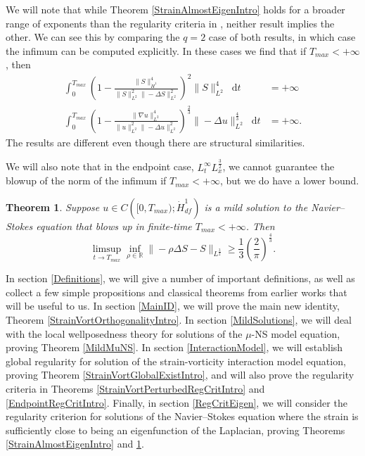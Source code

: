 \documentclass[11pt]{article}
\theoremstyle{plain}
\newtheorem{theorem}{Theorem}[section]
\theoremstyle{remark}
\numberwithin{equation}{section}
\newcommand{\diff}{\mathop{}\!\mathrm{d}}
\begin{document}
We will note that while Theorem \ref{StrainAlmostEigenIntro} holds for a broader range of exponents than the regularity criteria in \cites{MillerEigen}, neither result implies the other. We can see this by comparing the $q=2$ case of both results, in which case the infimum can be computed explicitly.
In these cases we find that 
if $T_{max}<+\infty$, then
\begin{align}
    \int_0^{T_{max}}\left(
    1-\frac{\|S\|_{\dot{H}^1}^4}{\|S\|_{L^2}^2
    \|-\Delta S\|_{L^2}^2}\right)^2
    \|S\|_{L^2}^4 \diff t
    &= +\infty \\
    \int_0^{T_{max}}\left(
    1-\frac{\|\nabla u\|_{L^2}^4}
    {\|u\|_{L^2}^2\|-\Delta u\|_{L^2}^2}
    \right)^\frac{2}{3} 
    \|-\Delta u\|_{L^2}^\frac{4}{3}
    \diff t
    &= +\infty.
\end{align}
The results are different even though there are structural similarities. 


We will also note that in the endpoint case, 
$L^\infty_t L^\frac{3}{2}_x$, we cannot guarantee the blowup of the norm of the infimum if $T_{max}<+\infty$,
but we do have a lower bound.
\begin{theorem} \label{StrainAlmostEigenEndpointIntro}
Suppose $u\in C\left([0,T_{max});\dot{H}^1_{df}\right)$
is a mild solution to the Navier--Stokes equation
that blows up in finite-time $T_{max}<+\infty$.
Then
\begin{equation}
    \limsup_{t\to T_{max}} 
    \inf_{\rho\in\mathbb{R}}
    \|-\rho\Delta S-S\|_{L^\frac{3}{2}}
    \geq
    \frac{1}{3}
    \left(\frac{2}{\pi}\right)^\frac{4}{3}.
\end{equation}
\end{theorem}



In section \ref{Definitions}, we will give a number of important definitions, as well as collect a few simple propositions and classical theorems from earlier works that will be useful to us.
In section \ref{MainID}, we will prove the main new identity, Theorem \ref{StrainVortOrthogonalityIntro}.
In section \ref{MildSolutions}, we will deal with the local wellposedness theory for solutions of the $\mu$-NS model equation, proving Theorem \ref{MildMuNS}.
In section \ref{InteractionModel}, we will establish global regularity for solution of the strain-vorticity interaction model equation, proving Theorem \ref{StrainVortGlobalExistIntro}, and will also prove the regularity criteria in Theorems \ref{StrainVortPerturbedRegCritIntro} and \ref{EndpointRegCritIntro}.
Finally, in section \ref{RegCritEigen}, we will consider the regularity criterion for solutions of the Navier--Stokes equation where the strain is sufficiently close to being an eigenfunction of the Laplacian, proving Theorems \ref{StrainAlmostEigenIntro} and \ref{StrainAlmostEigenEndpointIntro}.
\end{document}
